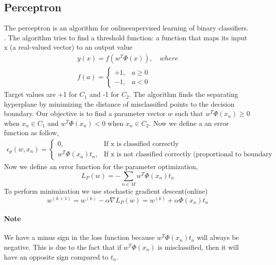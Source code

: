 \documentclass[main.tex]{subfiles}
\begin{document}
\subsection{Perceptron}
The perceptron is an algorithm for online\footnotemark supervised learning of binary classifiers. . The algorithm tries to find a threshold function: a function that maps its input x (a real-valued vector) to an output value
\begin{align*}
    y(x)= f(w^T\Phi(x)), \quad where \\
    f(a) =
    \begin{cases}
        +1,& a \geq 0\\
        -1,& a < 0
    \end{cases}
\end{align*}
Target values are +1 for $C_1$ and -1 for $C_2$. The algorithm finds the separating hyperplane by minimizing the distance of misclassified points to the decision boundary.
Our objective is to find a parameter vector $w$ such that $w^T \Phi(x_n) \geq 0$ when $x_n \in C_1$ and $w^T \Phi(x_n) < 0$ when $x_n \in C_2$.
Now we define a an error function as follow,
\begin{align*}
    \epsilon_p(w, x_n) =
    \begin{cases}
        0,& \text{If x is classified correctly}\\
        w^T\Phi(x_n)t_n,& \text{If x is not classified correctly (proportional to boundary distance)}
    \end{cases}
\end{align*}
Now we define an error function for the parameter optimization,
\begin{equation}
    L_P(w) = -\sum_{n \in M}w^T\Phi(x_n)t_n
\end{equation}
To perform minimization we use stochastic gradient descent(online)
\begin{equation}
    w^{(k+1)} = w^{(k)} - \alpha \nabla L_P(w) = w^{(k)} + \alpha \Phi(x_n)t_n
\end{equation}

\paragraph{Note} We have a minus sign in the loss function because $w^T\Phi(x_n)t_n$ will always be negative. This is due to the fact that if $w^T\Phi(x_n)$ is misclassified, then it will have an opposite sign compared to $t_n$.
\end{document}
